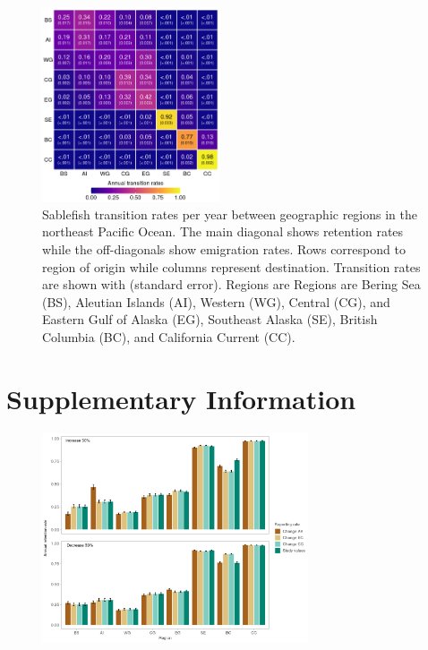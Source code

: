 \documentclass{article}
\begin{document}
\begin{figure}[htb]
    \centering
    \includegraphics[width = 0.47\textwidth]{heat-region-average-pooled}
    \caption{Sablefish transition rates per year between geographic regions in the northeast Pacific Ocean. The main diagonal shows retention rates while the off-diagonals show emigration rates. Rows correspond to region of origin while columns represent destination. Transition rates are shown with (standard error). Regions are Regions are Bering Sea (BS), Aleutian Islands (AI), Western (WG), Central (CG), and Eastern Gulf of Alaska (EG), Southeast Alaska (SE), British Columbia (BC), and California Current (CC).}
    \label{fig:heat-region-average-pooled}
\end{figure}


\section{Supplementary Information}
\begin{figure}[htb]
    \centering
    \includegraphics[width = 0.7\textwidth]{bar-sensitivity-reporting}
    \caption{}
    \label{fig:bar-sensitivity-reporting}
\end{figure}
\end{document}
